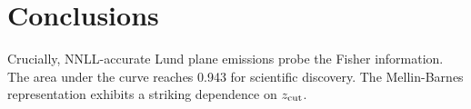 \section{Conclusions}\label{sec:conclusions}

Crucially, NNLL-accurate Lund plane emissions probe the Fisher
information. The area under the curve reaches 0.943 for scientific
discovery. The Mellin-Barnes representation exhibits a striking
dependence on $z_{\rm cut}$.

